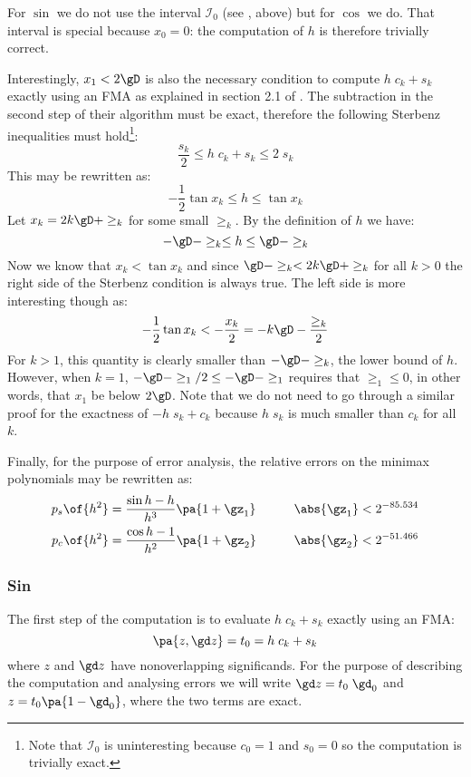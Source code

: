 \documentclass[10pt, a4paper, twoside]{basestyle}
\begin{document}
For $\sin$ we do not use the interval $\mathscr{I}_0$ (see , above) but for $\cos$ we do.  That interval is special because $x_0 = 0$: the computation of $h$ is therefore trivially correct.

Interestingly, $x_1 < 2 \gD$ is also the necessary condition to compute $h \; c_k + s_k$ exactly using an FMA as explained in section 2.1 of \cite{StehléZimmermann2005}.  The subtraction in the second step of their algorithm must be exact, therefore the following Sterbenz inequalities must hold\footnote{Note that $\mathscr{I}_0$ is uninteresting because $c_0 = 1$ and $s_0 = 0$ so the computation is trivially exact.}:
\[
\frac{s_k}{2} \le h \; c_k + s_k \le 2 \; s_k
\]
This may be rewritten as:
\[
-\frac{1}{2} \tan x_k \le h \le \tan x_k
\]
Let $x_k = 2 k \gD + \ge_k$ for some small $\ge_k$.  By the definition of $h$ we have:
\[
-\gD - \ge_k \le h \le \gD - \ge_k
\]
Now we know that $x_k < \tan x_k$ and since $\gD - \ge_k < 2 k \gD + \ge_k$ for all $k > 0$ the right side of the Sterbenz condition is always true.  The left side is more interesting though as:
\[
-\frac{1}{2} \tan x_k < -\frac{x_k}{2} = -k \gD - \frac{\ge_k}{2}
\]
For $k > 1$, this quantity is clearly smaller than $-\gD - \ge_k$, the lower bound of $h$.  However, when $k = 1$, $-\gD - \ge_1 / 2 \le -\gD - \ge_1$ requires that $\ge_1 \le 0$, in other words, that $x_1$ be below $2 \gD$.  Note that we do not need to go through a similar proof for the exactness of $-h \; s_k + c_k$ because $h \; s_k$ is much smaller than $c_k$ for all $k$.

Finally, for the purpose of error analysis, the relative errors on the minimax polynomials may be rewritten as:
\begin{align*}
p_s\of{h^2} &= \frac{\sin h - h}{h^3} \pa{1 + \gz_1} \qquad & \abs{\gz_1} < 2^{-85.534} \\
p_c\of{h^2} &= \frac{\cos h - 1}{h^2} \pa{1 + \gz_2} \qquad & \abs{\gz_2} < 2^{-51.466}
\end{align*}

\subsubsection*{Sin}\label{secerroranalysissin}

The first step of the computation is to evaluate $h \; c_k + s_k$ exactly using an FMA:
\[
\pa{z, \gd z} = t_0 = h \; c_k + s_k
\]
where $z$ and $\gd z$ have nonoverlapping significands.  For the purpose of describing the computation and analysing errors we will write $\gd z = t_0 \; \gd_0$ and $z = t_0 \pa{1 - \gd_0}$, where the two terms are exact.
\end{document}
